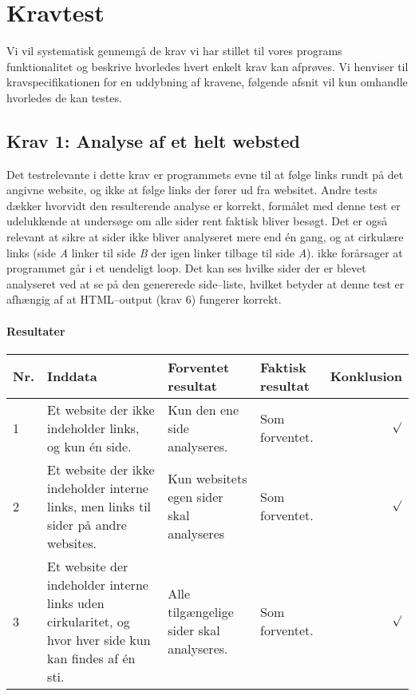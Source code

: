 \documentclass[a4paper,oneside,article]{memoir}
\begin{document}
\chapter{Kravtest}

Vi vil systematisk gennemgå de krav vi har stillet til vores programs
funktionalitet og beskrive hvorledes hvert enkelt krav kan
afprøves. Vi henviser til kravspecifikationen for en uddybning af
kravene, følgende afsnit vil kun omhandle hvorledes de kan testes.

\begin{landscape}
\section{Krav 1: Analyse af et helt websted}
Det testrelevante i dette krav er programmets evne til at følge links
rundt på det angivne website, og ikke at følge links der fører ud fra
websitet. Andre tests dækker hvorvidt den resulterende analyse er
korrekt, formålet med denne test er udelukkende at undersøge om alle
sider rent faktisk bliver besøgt. Det er også relevant at sikre at
sider ikke bliver analyseret mere end én gang, og at cirkulære links
(side \textit{A} linker til side \textit{B} der igen linker tilbage
til side \textit{A}). ikke forårsager at programmet går i et uendeligt
loop. Det kan ses hvilke sider der er blevet analyseret ved at se på
den genererede side--liste, hvilket betyder at denne test er afhængig
af at HTML--output (krav 6) fungerer korrekt.

\subsubsection{Resultater}
\begin{longtable}[c]{p{20pt}|p{220pt}|p{130pt}|p{130pt}|r}
\textbf{Nr.} &
\textbf{Inddata} &
\textbf{Forventet resultat} &
\textbf{Faktisk resultat} &
\textbf{Konklusion} \\ \hline

1 &
Et website der ikke indeholder links, og kun én side. &
Kun den ene side analyseres. &
Som forventet. &
$\surd$ \\ \hline

2 &
Et website der ikke indeholder interne links, men links til
sider på andre websites. &
Kun websitets egen sider skal analyseres &
Som forventet. &
$\surd$ \\ \hline

3 &
Et website der indeholder interne links uden cirkularitet, og
hvor hver side kun kan findes af én sti. &
Alle tilgængelige sider skal analyseres. &
Som forventet. &
$\surd$ \\ \hline


\end{longtable}
\end{landscape}
\end{document}
